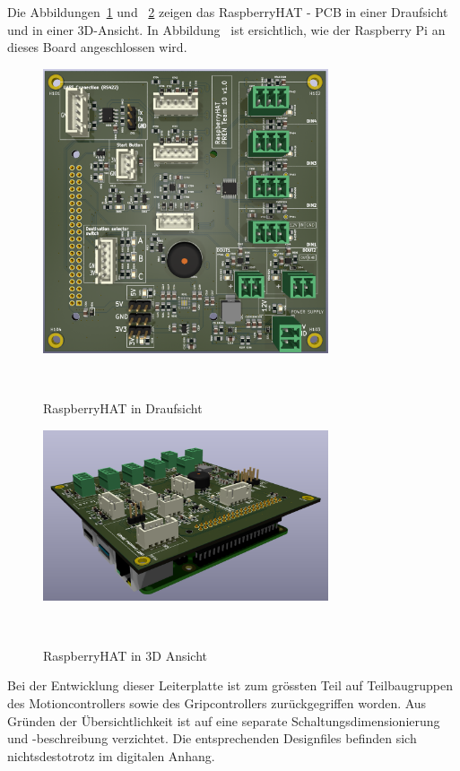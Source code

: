 \documentclass[main.tex]{subfiles} %
\begin{document}
Die Abbildungen~\ref{fig:RaspberryHAT_draufsicht} und
~\ref{fig:RaspberryHAT_3D} zeigen das RaspberryHAT - PCB in einer Draufsicht
und in einer 3D-Ansicht. In Abbildung~\label{fig:RaspberryHAT_3D} ist
ersichtlich, wie der Raspberry Pi an dieses Board angeschlossen wird.

\begin{figure}[H]
      \centering
      \includegraphics[width=0.75\textwidth]{./fig_RaspberryHAT/RaspberryHAT_draufsicht.png}
      \caption{RaspberryHAT in Draufsicht}~\label{fig:RaspberryHAT_draufsicht}
\end{figure}

\begin{figure}[H]
      \centering
      \includegraphics[width=0.75\textwidth]{./fig_RaspberryHAT/RaspberryHAT_3D.png}
      \caption{RaspberryHAT in 3D Ansicht}~\label{fig:RaspberryHAT_3D}
\end{figure}

Bei der Entwicklung dieser Leiterplatte ist zum grössten Teil auf
Teilbaugruppen des Motioncontrollers sowie des Gripcontrollers zurückgegriffen
worden. Aus Gründen der Übersichtlichkeit ist auf eine separate
Schaltungsdimensionierung und -beschreibung verzichtet. Die entsprechenden
Designfiles befinden sich nichtsdestotrotz im digitalen Anhang.
\end{document}
